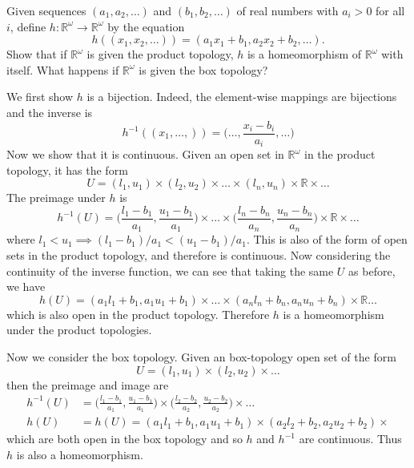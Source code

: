   \begin{exercise}[Munkres 19.8]
    Given sequences $(a_1, a_2, \ldots)$ and $(b_1, b_2, \ldots)$ of real numbers with $a_i > 0$ for all $i$, define $h : \mathbb{R}^\omega \to \mathbb{R}^\omega$ by the equation
    \begin{equation}
      h((x_1, x_2, \ldots)) = (a_1x_1 + b_1, a_2x_2 + b_2, \ldots).
    \end{equation}
    Show that if $\mathbb{R}^\omega$ is given the product topology, $h$ is a homeomorphism of $\mathbb{R}^\omega$ with itself. What happens if $\mathbb{R}^\omega$ is given the box topology?
  \end{exercise}
  \begin{solution}
    We first show $h$ is a bijection. Indeed, the element-wise mappings are bijections and the inverse is 
    \begin{equation}
      h^{-1} ((x_1, \ldots, )) = \bigg(\ldots,  \frac{x_i - b_i}{a_i}, \ldots \bigg)
    \end{equation} 
    Now we show that it is continuous. Given an open set in $\mathbb{R}^\omega$ in the product topology, it has the form 
    \begin{equation}
      U = (l_1, u_1) \times (l_2, u_2) \times \ldots \times (l_n, u_n) \times \mathbb{R} \times \ldots 
    \end{equation} 
    The preimage under $h$ is 
    \begin{equation}
      h^{-1} (U) = \bigg( \frac{l_1 - b_1}{a_1}, \frac{u_1 - b_1}{a_1} \bigg) \times \ldots \times \bigg( \frac{l_n - b_n}{a_n}, \frac{u_n - b_n}{a_n} \bigg) \times \mathbb{R} \times \ldots
    \end{equation}
    where $l_1 < u_1 \implies (l_1 - b_1) /a_1 < (u_1 - b_1) / a_1$. This is also of the form of open sets in the product topology, and therefore is continuous. Now considering the continuity of the inverse function, we can see that taking the same $U$ as before, we have 
    \begin{equation}
      h(U) = (a_1 l_1 + b_1, a_1 u_1 + b_1) \times \ldots \times (a_n l_n + b_n, a_n u_n + b_n) \times \mathbb{R} \ldots 
    \end{equation}
    which is also open in the product topology. Therefore $h$ is a homeomorphism under the product topologies. 

    Now we consider the box topology. Given an box-topology open set of the form 
    \begin{equation}
      U = (l_1, u_1) \times (l_2, u_2) \times \ldots
    \end{equation} 
    then the preimage and image are 
    \begin{align}
      h^{-1} (U) & = \bigg( \frac{l_1 - b_1}{a_1}, \frac{u_1 - b_1}{a_1} \bigg) \times \bigg( \frac{l_2 - b_2}{a_2}, \frac{u_2 - b_2}{a_2} \bigg) \times \ldots \\
      h(U) & = h(U) = (a_1 l_1 + b_1, a_1 u_1 + b_1) \times (a_2 l_2 + b_2, a_2 u_2 + b_2) \times 
    \end{align}
    which are both open in the box topology and so $h$ and $h^{-1}$ are continuous. Thus $h$ is also a homeomorphism. 
  \end{solution}

